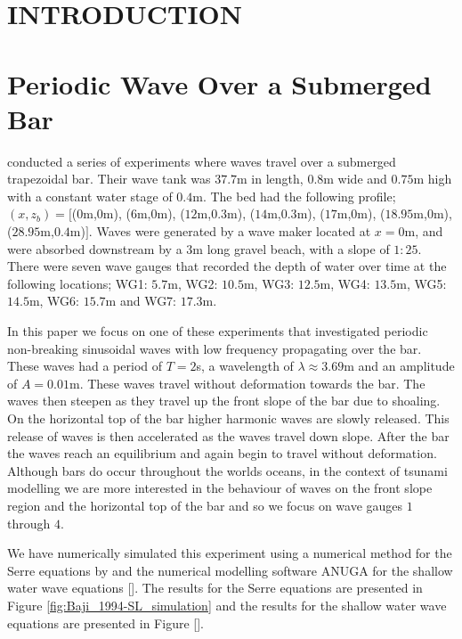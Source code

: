 \documentclass[a4paper,fleqn]{article} %
\begin{document}
\maketitle

\section{INTRODUCTION}


\section{Periodic Wave Over a Submerged Bar}
\label{Oscillatory Wave Over a Submerged Bar}
\cite{Beji-Battjes-1994} conducted a series of experiments where waves travel over a submerged trapezoidal bar. Their wave tank was $37.7$m in length, $0.8$m wide and $0.75$m high with a constant water stage of $0.4$m. The bed had the following profile; $(x,z_b) = [$($0$m,$0$m), ($6$m,$0$m), ($12$m,$0.3$m), ($14$m,$0.3$m), ($17$m,$0$m), ($18.95$m,$0$m), ($28.95$m,$0.4$m)$]$. Waves were generated by a wave maker located at $x=0$m, and were absorbed downstream by a $3$m long gravel beach, with a slope of $1:25$. There were seven wave gauges that recorded the depth of water over time at the following locations; WG1: $5.7$m, WG2: $10.5$m, WG3: $12.5$m, WG4: $13.5$m, WG5: $14.5$m, WG6: $15.7$m and WG7: $17.3$m. 

In this paper we focus on one of these experiments that investigated periodic non-breaking sinusoidal waves with low frequency propagating over the bar. These waves had a period of $T = 2$s, a wavelength of $\lambda \approx 3.69$m and an amplitude of $A = 0.01$m. These waves travel without deformation towards the bar. The waves then steepen as they travel up the front slope of the bar due to shoaling. On the horizontal top of the bar higher harmonic waves are slowly released. This release of waves is then accelerated as the waves travel down slope. After the bar the waves reach an equilibrium and again begin to travel without deformation. Although bars do occur throughout the worlds oceans, in the context of tsunami modelling we are more interested in the behaviour of waves on the front slope region and the horizontal top of the bar and so we focus on wave gauges $1$ through $4$. 

We have numerically simulated this experiment using a numerical method for the Serre equations by \cite{Zoppou-etal-2017} and the numerical modelling software ANUGA for the shallow water wave equations []. The results for the Serre equations are presented in Figure \ref{fig:Baji_1994-SL_simulation} and the results for the shallow water wave equations are presented in Figure []. 
\end{document}
